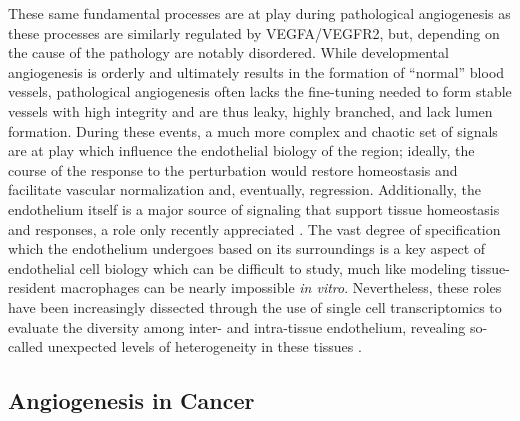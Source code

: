 These same fundamental processes are at play during pathological angiogenesis as these processes are similarly regulated by VEGFA/VEGFR2, but, depending on the cause of the pathology are notably disordered. While developmental angiogenesis is orderly and ultimately results in the formation of ``normal'' blood vessels, pathological angiogenesis often lacks the fine\hyp{}tuning needed to form stable vessels with high integrity and are thus leaky, highly branched, and lack lumen formation. During these events, a much more complex and chaotic set of signals are at play which influence the endothelial biology of the region; ideally, the course of the response to the perturbation would restore homeostasis and facilitate vascular normalization and, eventually, regression. Additionally, the endothelium itself is a major source of signaling that support tissue homeostasis and responses, a role only recently appreciated \citep{Amersfoort2022}. The vast degree of specification which the endothelium undergoes based on its surroundings is a key aspect of endothelial cell biology which can be difficult to study, much like modeling tissue\hyp{}resident macrophages can be nearly impossible \textit{in vitro}. Nevertheless, these roles have been increasingly dissected through the use of single cell transcriptomics to evaluate the diversity among inter\hyp{} and intra\hyp{}tissue endothelium, revealing so\hyp{}called unexpected levels of heterogeneity in these tissues \citep{Chavkin2020}.

\subsection{Angiogenesis in Cancer}\label{cancerang}

